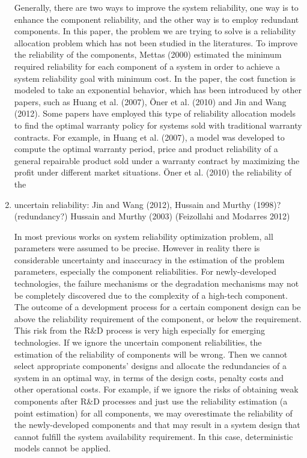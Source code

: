 \documentclass[preprint,12pt]{elsarticle}
\begin{document}
\begin{enumerate}
Generally, there are two ways to improve the system reliability, one way is to enhance the component reliability, and the other way is to employ redundant components. In this paper, the problem we are trying to solve is a reliability allocation problem which has not been studied in the literatures. To improve the reliability of the components, Mettas (2000) estimated the minimum required reliability for each component of a system in order to achieve a system reliability goal with minimum cost. In the paper, the cost function is modeled to take an exponential behavior, which has been introduced by other papers, such as Huang et al. (2007), \"{O}ner et al. (2010) and Jin and Wang (2012). Some papers have employed this type of reliability allocation models to find the optimal warranty policy for systems sold with traditional warranty contracts. For example, in Huang et al. (2007), a model was developed to compute the optimal warranty period, price and product reliability of a general repairable product sold under a warranty contract by maximizing the profit under different market situations. \"{O}ner et al. (2010) the reliability of the

\item uncertain reliability: Jin and Wang (2012), Hussain and Murthy (1998)?(redundancy?) Hussain and Murthy (2003) (Feizollahi and Modarres 2012)


In most previous works on system reliability optimization problem, all parameters were assumed to be precise. However in reality there is considerable uncertainty and inaccuracy in the estimation of the problem parameters, especially the component reliabilities. For newly-developed technologies, the failure mechanisms or the degradation mechanisms may not be completely discovered due to the complexity of a high-tech component. The outcome of a development process for a certain component design can be above the reliability requirement of the component, or below the requirement. This risk from the R\&D process is very high especially for emerging technologies. If we ignore the uncertain component reliabilities, the estimation of the reliability of components will be wrong. Then we cannot select appropriate components’ designs and allocate the redundancies of a system in an optimal way, in terms of the design costs, penalty costs and other operational costs. For example, if we ignore the risks of obtaining weak components after R\&D processes and just use the reliability estimation (a point estimation) for all components, we may overestimate the reliability of the newly-developed components and that may result in a system design that cannot fulfill the system availability requirement. In this case, deterministic models cannot be applied.


\end{enumerate}
\end{document}
